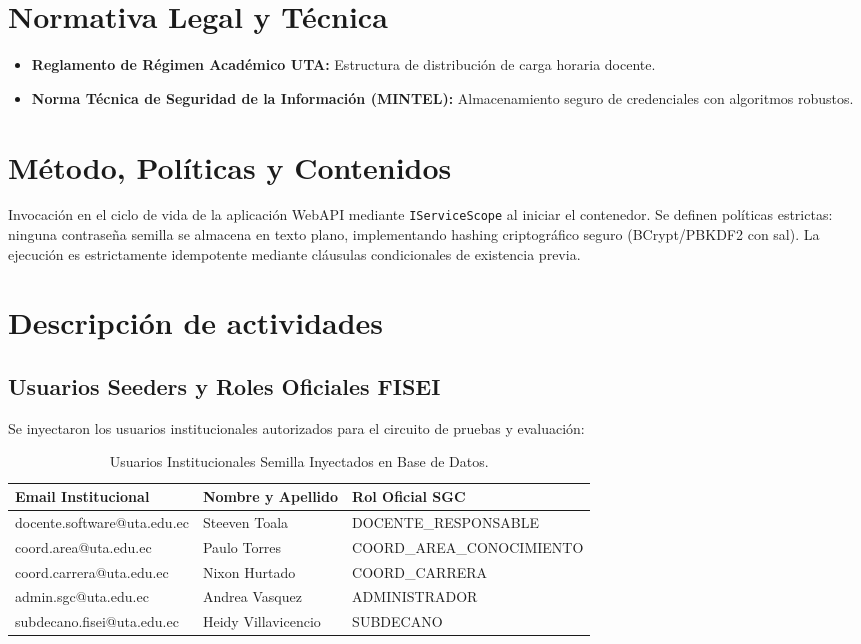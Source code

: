 \documentclass[12pt,a4paper]{article}
\begin{document}
\section{Normativa Legal y Técnica}
\begin{itemize}[leftmargin=1.5em, itemsep=2pt, topsep=2pt]
    \item \textbf{Reglamento de Régimen Académico UTA:} Estructura de distribución de carga horaria docente.
    \item \textbf{Norma Técnica de Seguridad de la Información (MINTEL):} Almacenamiento seguro de credenciales con algoritmos robustos.
\end{itemize}

\section{Método, Políticas y Contenidos}
Invocación en el ciclo de vida de la aplicación WebAPI mediante \texttt{IServiceScope} al iniciar el contenedor. Se definen políticas estrictas: ninguna contraseña semilla se almacena en texto plano, implementando hashing criptográfico seguro (BCrypt/PBKDF2 con sal). La ejecución es estrictamente idempotente mediante cláusulas condicionales de existencia previa.

\section{Descripción de actividades}

\subsection{Usuarios Seeders y Roles Oficiales FISEI}
Se inyectaron los usuarios institucionales autorizados para el circuito de pruebas y evaluación:

\begin{table}[htbp]
\centering
\small
\renewcommand{\arraystretch}{1.15}
\begin{tabularx}{\textwidth}{|l|l|X|}
\hline
\rowcolor{tableheader}
\textbf{Email Institucional} & \textbf{Nombre y Apellido} & \textbf{Rol Oficial SGC} \\
\hline
docente.software@uta.edu.ec & Steeven Toala & DOCENTE\_RESPONSABLE \\
\hline
coord.area@uta.edu.ec & Paulo Torres & COORD\_AREA\_CONOCIMIENTO \\
\hline
coord.carrera@uta.edu.ec & Nixon Hurtado & COORD\_CARRERA \\
\hline
admin.sgc@uta.edu.ec & Andrea Vasquez & ADMINISTRADOR \\
\hline
subdecano.fisei@uta.edu.ec & Heidy Villavicencio & SUBDECANO \\
\hline
\end{tabularx}
\caption{Usuarios Institucionales Semilla Inyectados en Base de Datos.}
\end{table}
\end{document}
